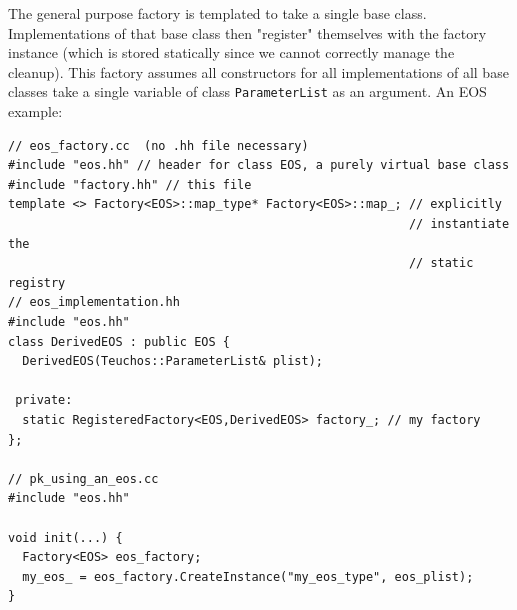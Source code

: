 The general purpose factory is templated to take a
single base class.  Implementations of that base class then "register"
themselves with the factory instance (which is stored statically since we
cannot correctly manage the cleanup).  This factory assumes all
constructors for all implementations of all base classes take a single
variable of class {\tt ParameterList} as an argument. 
An EOS example:
\begin{lstlisting}
// eos_factory.cc  (no .hh file necessary)
#include "eos.hh" // header for class EOS, a purely virtual base class
#include "factory.hh" // this file
template <> Factory<EOS>::map_type* Factory<EOS>::map_; // explicitly
                                                        // instantiate the
                                                        // static registry
// eos_implementation.hh
#include "eos.hh"
class DerivedEOS : public EOS {
  DerivedEOS(Teuchos::ParameterList& plist);

 private:
  static RegisteredFactory<EOS,DerivedEOS> factory_; // my factory
};

// pk_using_an_eos.cc
#include "eos.hh"

void init(...) {
  Factory<EOS> eos_factory;
  my_eos_ = eos_factory.CreateInstance("my_eos_type", eos_plist);
}
\end{lstlisting}



